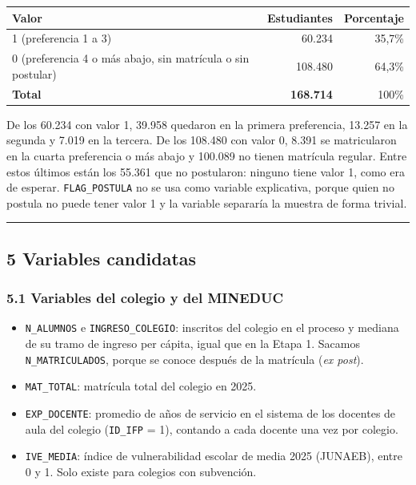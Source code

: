 \documentclass[11pt]{article}
\begin{document}
\begin{center}
\begin{tabular}{lrr}
\toprule
\textbf{Valor} & \textbf{Estudiantes} & \textbf{Porcentaje} \\
\midrule
1 (preferencia 1 a 3)                                     & 60.234  & 35,7\% \\
0 (preferencia 4 o más abajo, sin matrícula o sin postular) & 108.480 & 64,3\% \\
\midrule
\textbf{Total} & \textbf{168.714} & 100\% \\
\bottomrule
\end{tabular}
\end{center}

De los 60.234 con valor 1, 39.958 quedaron en la primera preferencia,
13.257 en la segunda y 7.019 en la tercera. De los 108.480 con valor 0,
8.391 se matricularon en la cuarta preferencia o más abajo y 100.089 no
tienen matrícula regular. Entre estos últimos están los 55.361 que no
postularon: ninguno tiene valor 1, como era de esperar.
\texttt{FLAG\_POSTULA} no se usa como variable explicativa, porque quien
no postula no puede tener valor 1 y la variable separaría la muestra de
forma trivial.

\medskip\hrule\medskip

\subsection*{5 \; Variables candidatas}

\subsubsection*{5.1 \; Variables del colegio y del MINEDUC}

\begin{itemize}[leftmargin=1.5em, itemsep=0.3em]
  \item \texttt{N\_ALUMNOS} e \texttt{INGRESO\_COLEGIO}: inscritos del
        colegio en el proceso y mediana de su tramo de ingreso per
        cápita, igual que en la Etapa 1. Sacamos
        \texttt{N\_MATRICULADOS}, porque se conoce después de la
        matrícula (\textit{ex post}).
  \item \texttt{MAT\_TOTAL}: matrícula total del colegio en 2025.
  \item \texttt{EXP\_DOCENTE}: promedio de años de servicio en el sistema
        de los docentes de aula del colegio (\texttt{ID\_IFP} = 1),
        contando a cada docente una vez por colegio.
  \item \texttt{IVE\_MEDIA}: índice de vulnerabilidad escolar de media
        2025 (JUNAEB), entre 0 y 1. Solo existe para colegios con
        subvención.
\end{itemize}
\end{document}
